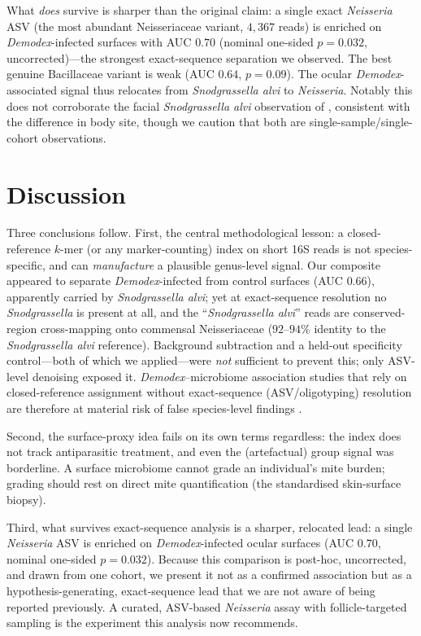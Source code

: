 \documentclass[11pt]{article}
\newcommand{\salvi}{\textit{Snodgrassella alvi}}
\newcommand{\demodex}{\textit{Demodex}}
\begin{document}
What \emph{does} survive is sharper than the original claim: a single exact
\textit{Neisseria} ASV (the most abundant Neisseriaceae variant, $4{,}367$ reads)
is enriched on \demodex-infected surfaces with AUC $0.70$ (nominal one-sided
$p=0.032$, uncorrected)---the strongest exact-sequence separation we observed.
The best genuine Bacillaceae variant is weak (AUC $0.64$, $p=0.09$). The ocular
\demodex-associated signal thus relocates from \salvi{} to \textit{Neisseria}.
Notably this does not corroborate the facial \salvi{} observation of
\citet{olah2025}, consistent with the difference in body site, though we caution
that both are single-sample/single-cohort observations.

\section{Discussion}

Three conclusions follow. First, the central methodological lesson: a
closed-reference $k$-mer (or any marker-counting) index on short 16S reads is not
species-specific, and can \emph{manufacture} a plausible genus-level signal. Our
composite appeared to separate \demodex-infected from control surfaces
(AUC $0.66$), apparently carried by \salvi{}; yet at exact-sequence resolution no
\textit{Snodgrassella} is present at all, and the ``\salvi{}'' reads are
conserved-region cross-mapping onto commensal Neisseriaceae ($92$--$94\%$ identity
to the \salvi{} reference). Background subtraction and a held-out specificity
control---both of which we applied---were \emph{not} sufficient to prevent this;
only ASV-level denoising exposed it. \demodex--microbiome association studies that
rely on closed-reference assignment without exact-sequence (ASV/oligotyping)
resolution are therefore at material risk of false species-level findings
\citep{callahan2017}.

Second, the surface-proxy idea fails on its own terms regardless: the index does
not track antiparasitic treatment, and even the (artefactual) group signal was
borderline. A surface microbiome cannot grade an individual's mite burden;
grading should rest on direct mite quantification (the standardised skin-surface
biopsy).

Third, what survives exact-sequence analysis is a sharper, relocated lead: a
single \textit{Neisseria} ASV is enriched on \demodex-infected ocular surfaces
(AUC $0.70$, nominal one-sided $p=0.032$). Because this comparison is post-hoc,
uncorrected, and drawn from one cohort, we present it not as a confirmed
association but as a hypothesis-generating, exact-sequence lead that we are not
aware of being reported previously. A curated, ASV-based \textit{Neisseria} assay
with follicle-targeted sampling is the experiment this analysis now recommends.
\end{document}
